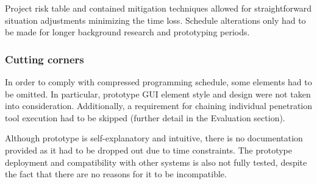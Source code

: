 		Project risk table and contained mitigation techniques allowed for straightforward situation adjustments minimizing the time loss. Schedule alterations only had to be made for longer background research and prototyping periods.
		
		\subsubsection{Cutting corners}\label{sec:cut-corners}
		In order to comply with compressed programming schedule, some elements had to be omitted. In particular, prototype GUI element style and design were not taken into consideration. Additionally, a requirement for chaining individual penetration tool execution had to be skipped (further detail in the Evaluation section). 
		
		Although prototype is self-explanatory and intuitive, there is no documentation provided as it had to be dropped out due to time constraints. The prototype deployment and compatibility with other systems is also not fully tested, despite the fact that there are no reasons for it to be incompatible. 

